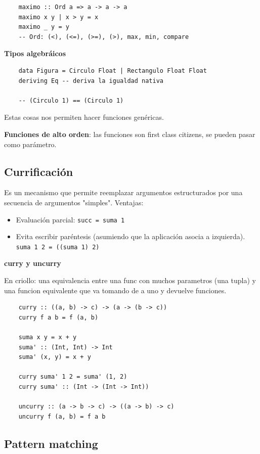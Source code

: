 \documentclass{report}
\theoremstyle{definition} %
\begin{document}
\begin{verbatim}
    maximo :: Ord a => a -> a -> a
    maximo x y | x > y = x
    maximo _ y = y
    -- Ord: (<), (<=), (>=), (>), max, min, compare
\end{verbatim}

\textbf{Tipos algebráicos}

\begin{verbatim}
    data Figura = Circulo Float | Rectangulo Float Float
    deriving Eq -- deriva la igualdad nativa

    -- (Circulo 1) == (Circulo 1)
\end{verbatim}

Estas cosas nos permiten hacer funciones genéricas.

\textbf{Funciones de alto orden}: las funciones son first class citizens, se
pueden pasar como parámetro.

\subsection{Currificación}

Es un mecanismo que permite reemplazar argumentos estructurados por una
secuencia de argumentos "simples". Ventajas:

\begin{itemize}
    \item Evaluación parcial: \texttt{succ = suma 1}
    \item Evita escribir paréntesis (asumiendo que la aplicación asocia a
    izquierda). \texttt{suma 1 2 = ((suma 1) 2)}
\end{itemize}

\textbf{curry y uncurry}

En criollo: una equivalencia entre una func con muchos parametros (una tupla) y
una funcion equivalente que va tomando de a uno y devuelve funciones.

\begin{verbatim}
    curry :: ((a, b) -> c) -> (a -> (b -> c))
    curry f a b = f (a, b)

    suma x y = x + y
    suma' :: (Int, Int) -> Int
    suma' (x, y) = x + y

    curry suma' 1 2 = suma' (1, 2)
    curry suma' :: (Int -> (Int -> Int))

    uncurry :: (a -> b -> c) -> ((a -> b) -> c)
    uncurry f (a, b) = f a b
\end{verbatim}

\subsection{Pattern matching}
\end{document}
